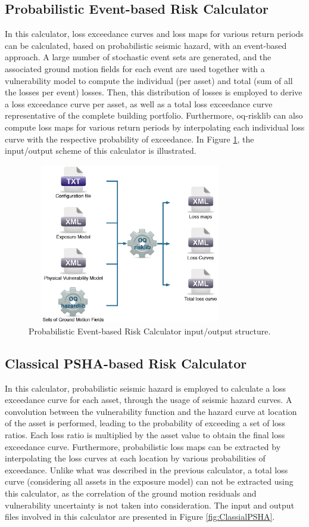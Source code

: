 \subsection{Probabilistic Event-based Risk Calculator}
In this calculator, loss exceedance curves and loss maps for various return periods can be calculated, based on probabilistic seismic hazard, with an event-based approach. A large number of stochastic event sets are generated, and the associated ground motion fields for each event are used together with a vulnerability model to compute the individual (per asset) and total (sum of all the losses per event) losses. Then, this distribution of losses is employed to derive a loss exceedance curve per asset, as well as a total loss exceedance curve representative of the complete building portfolio. Furthermore, oq-risklib can also compute loss maps for various return periods by interpolating each individual loss curve with the respective probability of exceedance. In Figure \ref{fig:ProbEvent}, the input/output scheme of this calculator is illustrated. 

\begin{figure}[ht]
\centering
\includegraphics[width=9cm,height=7cm]{./figures/risk/ProbEvent.eps}
\caption{Probabilistic Event-based Risk Calculator input/output structure.}
\label{fig:ProbEvent}
\end{figure}

\subsection{Classical PSHA-based Risk Calculator}
In this calculator, probabilistic seismic hazard is employed to calculate a loss exceedance curve for each asset, through the usage of seismic hazard curves. A convolution between the vulnerability function and the hazard curve at location of the asset is performed, leading to the probability of exceeding a set of loss ratios. Each loss ratio is multiplied by the asset value to obtain the final loss exceedance curve. Furthermore, probabilistic loss maps can be extracted by interpolating the loss curves at each location by various probabilities of exceedance. Unlike what was described in the previous calculator, a total loss curve (considering all assets in the exposure model) can not be extracted using this calculator, as the correlation of the ground motion residuals and vulnerability uncertainty is not taken into consideration. The input and output files involved in this calculator are presented in Figure \ref{fig:ClassialPSHA}.


